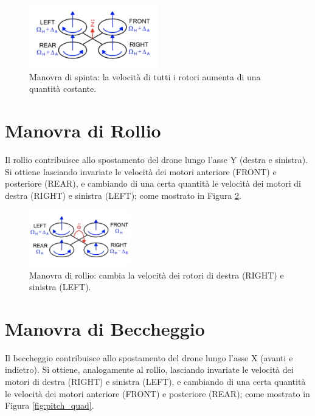 \begin{figure}[H]
    \centering
    \includegraphics[width=0.5\textwidth]{gfx/thrust_quad}
    \caption[Manovra di spinta di un quadrirotore.]{Manovra di spinta: la velocità di tutti i rotori aumenta di una quantità costante.}
    \label{fig:thrust_quad}
\end{figure}

\pagebreak

\section*{Manovra di Rollio}
Il rollio contribuisce allo spostamento del drone lungo l'asse Y (destra e sinistra). Si ottiene lasciando invariate le velocità dei motori anteriore (FRONT) e posteriore (REAR), e cambiando di una certa quantità le velocità dei motori di destra (RIGHT) e sinistra (LEFT); come mostrato in Figura \ref{fig:roll_quad}.

\begin{figure}[H]
    \centering
    \includegraphics[width=0.39\textwidth]{gfx/roll_quad}
    \caption[Manovra di rollio di un quadrirotore.]{Manovra di rollio: cambia la velocità dei rotori di destra (RIGHT) e sinistra (LEFT).}
    \label{fig:roll_quad}
\end{figure}

\section*{Manovra di Beccheggio}
Il beccheggio contribuisce allo spostamento del drone lungo l'asse X (avanti e indietro). Si ottiene, analogamente al rollio, lasciando invariate le velocità dei motori di destra (RIGHT) e sinistra (LEFT), e cambiando di una certa quantità le velocità dei motori anteriore (FRONT) e posteriore (REAR); come mostrato in Figura \ref{fig:pitch_quad}.

